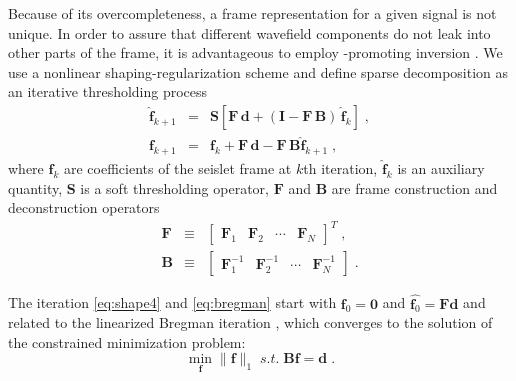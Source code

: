 Because of its overcompleteness, a frame representation for a given
signal is not unique. In order to assure that different wavefield
components do not leak into other parts of the frame, it is
advantageous to employ -promoting inversion
\cite[]{Fomel10a}. We use a nonlinear shaping-regularization scheme
\cite[]{Fomel08} and define sparse decomposition as an iterative
thresholding process \cite[]{Daubechies04}
\begin{eqnarray}
  \label{eq:shape4}
  \hat{\mathbf{f}}_{k+1} & = & \mathbf{S}[\mathbf{F}\,
     \mathbf{d}+(\mathbf{I}-\mathbf{F}\,
   \mathbf{B})\,\hat{\mathbf{f}}_{k}]\;, \\
   \mathbf{f}_{k+1} & = & \mathbf{f}_k + \mathbf{F}\,
   \mathbf{d}- \mathbf{F}\,\mathbf{B} \hat{\mathbf{f}}_{k+1}\;,
   \label{eq:bregman} 
\end{eqnarray}
where $\mathbf{f}_k$ are coefficients of the seislet
frame at $k$th iteration, $\hat{\mathbf{f}}_k$ is an auxiliary
quantity, $\mathbf{S}$ is a soft thresholding operator, $\mathbf{F}$
and $\mathbf{B}$ are frame construction and deconstruction operators
\begin{eqnarray}
  \label{eq:f}
  \mathbf{F} & \equiv & 
\left[\begin{array}{cccc}\mathbf{F}_1 &\mathbf{F}_2 & 
    \cdots &\mathbf{F}_N\end{array}\right]^T\;, \\
\mathbf{B} & \equiv &  
\left[\begin{array}{cccc}\mathbf{F}_1^{-1} &\mathbf{F}_2^{-1} & 
    \cdots &\mathbf{F}_N^{-1}\end{array}\right]\;.
    \label{eq:b}
\end{eqnarray}

 The iteration  \ref{eq:shape4} and \ref{eq:bregman}
start with $\mathbf{f}_0=\mathbf{0}$ and
$\hat{\mathbf{f}_0}=\mathbf{F}\mathbf{d}$ and   related to the
linearized Bregman iteration \cite[]{Cai09}, which converges to the
solution of the constrained minimization problem:
\begin{equation}
  \label{eq:convex}
  \min_{\mathbf{f}}\|\mathbf{f}\|_1 \; s.t.\; \mathbf{Bf} = \mathbf{d}\;.
\end{equation}

